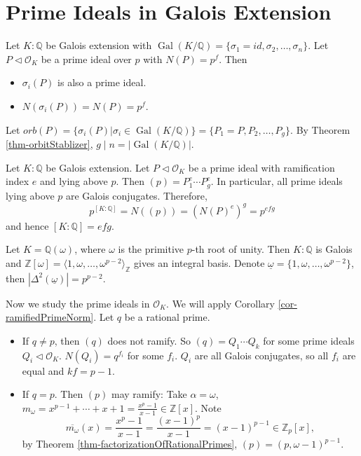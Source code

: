 \section{Prime Ideals in Galois Extension} \label{sec-Galoisprime}
Let $K:\mathbb{Q}$ be Galois extension with $\operatorname{Gal}(K /\mathbb{Q})=\{\sigma_{1}=id,\sigma_{2},\dots, \sigma_{n}\}$. Let $P\lhd \mathcal{O}_{K}$ be a prime ideal over $p$ with $N(P)=p^{f}$. Then 
\begin{itemize}
    \item $\sigma_{i}(P)$ is also a prime ideal. 
    \item $N(\sigma_{i}(P))=N(P)=p^{f}$. 
\end{itemize}
Let $orb(P)=\{\sigma_{i}(P)|\sigma_{i}\in \operatorname{Gal}(K /\mathbb{Q})\}=\{P_{1}=P,P_{2},\dots, P_{g}\}$. By Theorem \ref{thm-orbitStablizer}, $g\mid n=\left| \operatorname{Gal}(K /\mathbb{Q}) \right| $. 

\begin{theorem}
    Let $K :\mathbb{Q}$ be Galois extension. Let $P\lhd \mathcal{O}_{K}$ be a prime ideal with ramification index $e$ and lying above $p$. Then $(p)=P_{1}^{e}\cdots P_{g}^{e}$. In particular, all prime ideals lying above $p$ are Galois conjugates. Therefore, 
    $$p^{[K:\mathbb{Q}]}= N((p)) = (N(P)^e)^g = p^{efg}$$
    and hence $[K:\mathbb{Q}] = efg.$
\end{theorem}

\begin{example} \label{eg-cycloram}
    Let $K=\mathbb{Q}(\omega)$, where $\omega$ is the primitive $p$-th root of unity. Then $K:\mathbb{Q}$ is Galois and $\mathbb{Z}[\omega]=\langle 1,\omega,\dots, \omega^{p-2}\rangle_{\mathbb{Z}}$ gives an integral basis. Denote $\underline{\omega}=\{1,\omega,\dots, \omega^{p-2}\}$, then $\left| \Delta^{2}(\underline{\omega}) \right|=p^{p-2}$. 

    Now we study the prime ideals in $\mathcal{O}_{K}$. We will apply Corollary \ref{cor-ramifiedPrimeNorm}. Let $q$ be a rational prime. 
    \begin{itemize}
        \item If $q\neq p$, then $(q)$ does not ramify. So $(q)=Q_{1}\cdots Q_{k}$ for some prime ideals $Q_{i}\lhd \mathcal{O}_{K}$. $N(Q_{i})=q^{f_{i}}$ for some $f_{i}$. $Q_{i}$ are all Galois conjugates, so all $f_{i}$ are equal and $kf=p-1$. 
        \item If $q=p$. Then $(p)$ may ramify: Take $\alpha=\omega$, $m_{\omega}=x^{p-1}+\cdots+ x+1=\frac{x^{p}-1}{x-1}\in \mathbb{Z}[x]$. Note 
        \[
        \overline{m_{\omega}}(x)=\frac{x^{p}-1}{x-1}=\frac{(x-1)^{p}}{x-1}=(x-1)^{p-1}\in \mathbb{Z}_{p}[x],
        \]
        by Theorem \ref{thm-factorizationOfRationalPrimes}, $(p)=(p,\omega-1)^{p-1}$. 
    \end{itemize}
\end{example}

